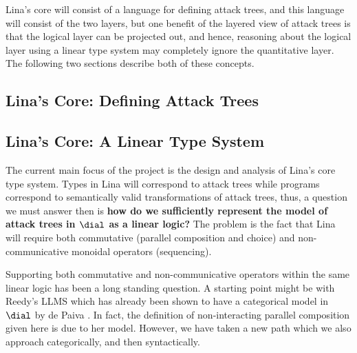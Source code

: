 Lina's core will consist of a language for defining attack trees, and
this language will consist of the two layers, but one benefit of the
layered view of attack trees is that the logical layer can be
projected out, and hence, reasoning about the logical layer using a
linear type system may completely ignore the quantitative layer.  The
following two sections describe both of these concepts.

\subsection{Lina's Core: Defining Attack Trees}
\label{subsec:linas_core_defining_attack_trees}




\subsection{Lina's Core: A Linear Type System}
\label{subsec:linas_core_linear_type_system}

The current main focus of the project is the design and analysis of
Lina's core type system.  Types in Lina will correspond to attack
trees while programs correspond to semantically valid transformations
of attack trees, thus, a question we must answer then is \textbf{how
  do we sufficiently represent the model of attack trees in $\dial$ as
  a linear logic?}  The problem is the fact that Lina will require
both commutative (parallel composition and choice) and
non-communicative monoidal operators (sequencing).

Supporting both commutative and non-communicative operators within the
same linear logic has been a long standing question.  A starting point
might be with Reedy's LLMS which has already been shown to have a
categorical model in $\dial$ by de Paiva \cite{dePaiva:2014a}.  In
fact, the definition of non-interacting parallel composition given
here is due to her model.  However, we have taken a new path which we
also approach categorically, and then syntactically.


